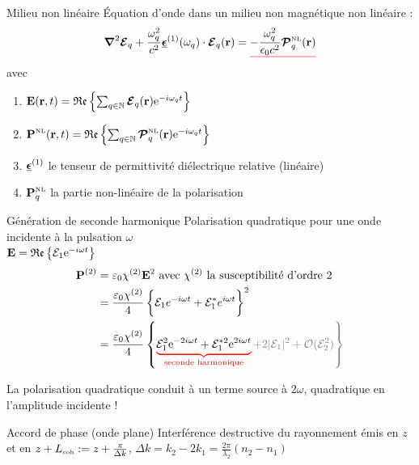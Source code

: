 \documentclass{beamer}
\begin{document}
\begin{frame}{Milieu non linéaire}
Équation d'onde dans un milieu non magnétique non linéaire :
\begin{equation*}
\boldsymbol{\nabla}^2 \boldsymbol{\E}_q + \frac{\omega_q^2}{c^2}\tens\epsilon^{(1)}(\omega_q)\cdot \v \E_q(\v r) = \uline{red}{ - \frac{\omega_q^2}{\epsilon_0 c^2} \boldsymbol{\mathcal{P}}^\mathsc{NL}_q(\v r) }
\end{equation*}
avec
\begin{enumerate}
\item[ ] $\v E(\v r, t) = \mathfrak{Re} \left\{ \sum_{q \in \mathbb N} \v {\boldsymbol{\mathcal E}}_q (\v r) \e{-i \omega_q t} \right\}$
\item[ ] $\v P^\mathsc{NL} (\v r, t) = \mathfrak{Re} \left\{ \sum_{q \in \mathbb N} \v {\boldsymbol{\mathcal P}}^\mathsc{NL}_q (\v r) \e{-i \omega_q t} \right\}$
\item[ ] $\tens \epsilon^{(1)}$ le tenseur de permittivité diélectrique relative (linéaire)
\item[ ] $\v P^\mathsc{NL}_q$ la partie non-linéaire de la polarisation
\end{enumerate}
\end{frame}

\begin{frame}{Génération de seconde harmonique}
Polarisation quadratique pour une onde incidente à la pulsation $\omega$ \\
$\v E = \mathfrak{Re} \left\{ \E_1 \e{-i\omega t} \right\}$
\begin{align*}
\v P^{(2)} &= \varepsilon_0 \chi^{(2)} \v E^2 \text{ avec $\chi^{(2)}$ la susceptibilité d'ordre 2}\\
&= \frac{\varepsilon_0 \chi^{(2)}}{4} \left\{\mathcal E_1 e^{-i\omega t} + \mathcal E_1^* e^{i\omega t} \vphantom{\frac12}\right\}^2 \\
&= \frac{\varepsilon_0 \chi^{(2)}}{4} \left\{\ubrace{red}{\mathcal E_1^2 \e{-2i\omega t} + \E_1^{*2} \e{2i\omega t}}{seconde harmonique}
\color{gray} + 2|\mathcal E_1|^2 + \mathcal O(\E_2^2) \vphantom{\frac12} \right\} 
\end{align*}
\begin{beamerboxesrounded}[width=\textwidth]{}
La polarisation quadratique conduit à un terme source à $2\omega$, quadratique en l'amplitude incidente !
\end{beamerboxesrounded}
\end{frame}

\begin{frame}{Accord de phase (onde plane)}
\centering
%
\vspace*{-1cm}
Interférence destructive du rayonnement émis en $z$ et en  $z+L_\mathsc{coh} := z + \frac{\pi}{\Delta k}$, $\Delta k = k_2 - 2 k_1 = \frac{2\pi}{\lambda_2} \left(n_2 - n_1\right)$
\end{frame}
\end{document}
